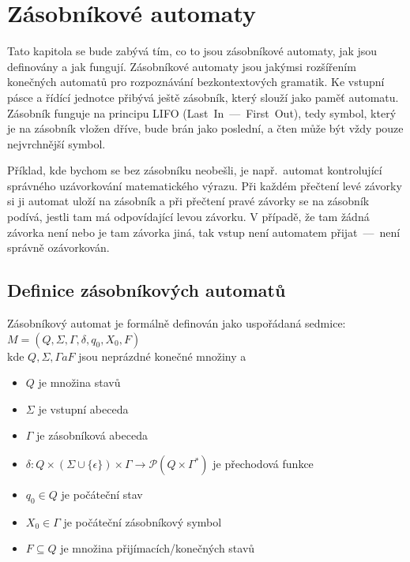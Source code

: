 \chapter{Zásobníkové automaty}\label{chap:PushdownAutomata}

Tato kapitola se bude zabývá tím, co to jsou zásobníkové automaty, jak jsou definovány a jak fungují. Zásobníkové automaty jsou jakýmsi rozšířením konečných automatů pro rozpoznávání bezkontextových gramatik. Ke vstupní pásce a řídící jednotce přibývá ještě zásobník, který slouží jako paměť automatu. Zásobník funguje na principu LIFO (Last~In~---~First~Out), tedy symbol, který je na zásobník vložen dříve, bude brán jako poslední, a čten může být vždy pouze nejvrchnější symbol.

Příklad, kde bychom se bez zásobníku neobešli, je např.~automat kontrolující správného uzávorkování matematického výrazu. Při každém přečtení levé závorky si ji automat uloží na zásobník a při přečtení pravé závorky se na zásobník podívá, jestli tam má odpovídající levou závorku. V případě, že tam žádná závorka není nebo je tam závorka jiná, tak vstup není automatem přijat~---~není správně ozávorkován.

\section{Definice zásobníkových automatů}\label{sec:DefinitonOfPDA}

Zásobníkový automat\cite{Sipserc2006} je formálně definován jako uspořádaná sedmice:\\
\indent\emph{$M = (Q, \Sigma, \Gamma, \delta, q_0, X_0, F)$}\\
kde $Q, \Sigma, \Gamma a F$ jsou neprázdné konečné množiny a 

\begin{itemize}
    \item $Q$ je množina stavů
    \item $\Sigma$ je vstupní abeceda
    \item $\Gamma$ je zásobníková abeceda
    \item $\delta : Q \times (\Sigma \cup \{\epsilon\}) \times \Gamma \rightarrow \mathcal{P}(Q \times \Gamma^*)$ je přechodová funkce
    \item $q_0 \in Q$ je počáteční stav
    \item $X_0 \in \Gamma$ je počáteční zásobníkový symbol
    \item $F \subseteq Q$ je množina přijímacích/konečných stavů
\end{itemize}

